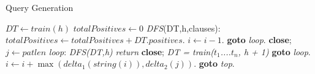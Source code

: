 \begin{algorithm}
\caption{Query Generation}\label{euclid}
\begin{algorithmic}[1]
\State $\textit{DT} \gets \textit{train}(h)$
\State $totalPositives \gets \textit{0}$
\BState \emph{DFS}(DT,h,clauses):
 \Return 
\EndIf
{}
\State $totalPositives \gets totalPositives + DT.positives$.
\break
\EndIf
\State $i \gets i-1$.
\State \textbf{goto} \emph{loop}.
\State \textbf{close};
\EndIf
\State $j \gets \textit{patlen}$
\BState \emph{loop}:
\State \textit{DFS(DT,h)}
\State \textit{return}
\State \textbf{close};
\EndIf
\State \textit{DT = train($t_1$....$t_n$, h + 1)}
\State \textbf{goto} \emph{loop}.
\State $i \gets i+\max(\textit{delta}_1(\textit{string}(i)),\textit{delta}_2(j))$.
\State \textbf{goto} \emph{top}.
\EndProcedure
\end{algorithmic}
\end{algorithm}


